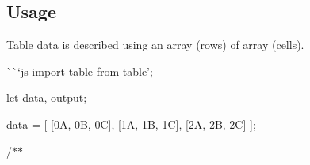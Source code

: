 \subsection*{Usage}

Table data is described using an array (rows) of array (cells).

\`{}\`{}`js import table from \textquotesingle{}table';

let data, output;

data = \mbox{[} \mbox{[}\textquotesingle{}0A\textquotesingle{}, \textquotesingle{}0B\textquotesingle{}, \textquotesingle{}0C\textquotesingle{}\mbox{]}, \mbox{[}\textquotesingle{}1A\textquotesingle{}, \textquotesingle{}1B\textquotesingle{}, \textquotesingle{}1C\textquotesingle{}\mbox{]}, \mbox{[}\textquotesingle{}2A\textquotesingle{}, \textquotesingle{}2B\textquotesingle{}, \textquotesingle{}2C\textquotesingle{}\mbox{]} \mbox{]};

/$\ast$$\ast$
\begin{DoxyItemize}
\item 
\end{DoxyItemize}
